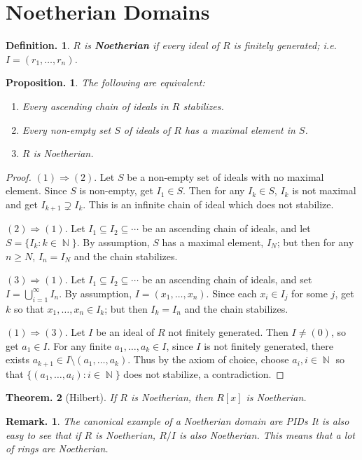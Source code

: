 \documentclass[11pt, a4paper]{memoir}
\DeclareMathOperator{\N}{{\mathbb{N}}}
\theoremstyle{change}
\newtheorem{theorem}{Theorem.}[section]
\newtheorem{proposition}[theorem]{Proposition.}
\theoremstyle{plain}
\theoremstyle{nonumberplain}
\newtheorem{definition}{Definition.}
\newtheorem{remark}{Remark.}
\newtheorem{proof}{Proof}
\begin{document}
\section{Noetherian Domains}
\begin{definition}
    $R$ is \textbf{Noetherian} if every ideal of $R$ is finitely generated; i.e. $I=(r_1,\ldots,r_n)$.
\end{definition}
\begin{proposition}\label{noe}
    The following are equivalent:
    \begin{enumerate}[nolistsep]
        \item Every ascending chain of ideals in $R$ stabilizes.
        \item Every non-empty set $S$ of ideals of $R$ has a maximal element in $S$.
        \item $R$ is Noetherian.
    \end{enumerate}
\end{proposition}
\begin{proof}
    $(1)\Rightarrow (2)$.
    Let $S$ be a non-empty set of ideals with no maximal element.
    Since $S$ is non-empty, get $I_1\in S$.
    Then for any $I_k\in S$, $I_k$ is not maximal and get $I_{k+1}\supsetneq I_k$.
    This is an infinite chain of ideal which does not stabilize.

    $(2)\Rightarrow(1)$.
    Let $I_1\subseteq I_2\subseteq\cdots$ be an ascending chain of ideals, and let $S=\{I_k:k\in\N\}$.
    By assumption, $S$ has a maximal element, $I_N$; but then for any $n\geq N$, $I_n=I_N$ and the chain stabilizes.

    $(3)\Rightarrow(1)$.
    Let $I_1\subseteq I_2\subseteq\cdots$ be an ascending chain of ideals, and set $I=\bigcup_{i=1}^\infty I_n$.
    By assumption, $I=(x_1,\ldots,x_n)$.
    Since each $x_i\in I_j$ for some $j$, get $k$ so that $x_1,\ldots,x_n\in I_k$; but then $I_k=I_n$ and the chain stabilizes.

    $(1)\Rightarrow(3)$.
    Let $I$ be an ideal of $R$ not finitely generated.
    Then $I\neq(0)$, so get $a_1\in I$.
    For any finite $a_1,\ldots,a_k\in I$, since $I$ is not finitely generated, there exists $a_{k+1}\in I\setminus(a_1,\ldots,a_k)$.
    Thus by the axiom of choice, choose $a_i,i\in\N$ so that $\{(a_1,\ldots,a_i):i\in\N\}$ does not stabilize, a contradiction.
\end{proof}
\begin{theorem}[Hilbert]
    If $R$ is Noetherian, then $R[x]$ is Noetherian.
\end{theorem}
\begin{remark}
    The canonical example of a Noetherian domain are PIDs
    It is also easy to see that if $R$ is Noetherian, $R/I$ is also Noetherian.
    This means that a lot of rings are Noetherian.
\end{remark}
\end{document}

